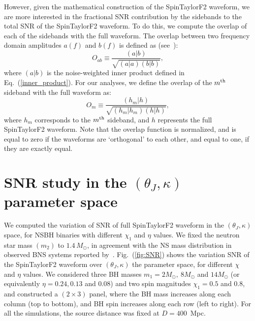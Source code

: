 However, given the mathematical construction of the SpinTaylorF2 waveform, we
are more interested in the fractional SNR contribution by the sidebands to the
total SNR of the SpinTaylorF2 waveform. To do this, we compute the overlap of
each of the sidebands with the full waveform. The overlap between two
frequency domain amplitudes $a(f)$ and $b(f)$ is defined as
(see~\cite{Lundgren2014}):
\begin{equation} 
O_{ab} \equiv \dfrac{(a|b)}{\sqrt{(a|a)(b|b)}},
\end{equation} 
where $(a|b)$ is the noise-weighted inner product defined in
Eq.~(\ref{inner_product}). For our analyses, we define the overlap of the
$m^{\rm th}$ sideband with the full waveform as:
\begin{equation} 
O_{m} \equiv \dfrac{(h_m|h)}{\sqrt{(h_m|h_m)(h|h)}},
\end{equation} 
where $h_m$ corresponds to the $m^{\rm th}$ sideband, and $h$ represents the
full SpinTaylorF2 waveform. Note that the overlap function is normalized, and
is equal to zero if the waveforms are `orthogonal' to each other, and equal to
one, if they are exactly equal.

\section{SNR study in the $(\theta_J, \kappa)$ parameter space}

We computed the variation of SNR of full SpinTaylorF2 waveform in the
$(\theta_J, \kappa)$  space, for NSBH binaries with different $\chi_1$ and
$\eta$ values. We fixed the neutron star mass $(m_{2})$ to $1.4\,M_{\odot}$,
in agreement with the NS mass distribution in observed BNS systems reported
by~\cite{Lorimer}. Fig.~(\ref{fig:SNR}) shows the variation SNR of the
SpinTaylorF2 waveform over $(\theta_J, \kappa)$ the parameter space, for
different $\chi$ and $\eta$ values. We considered three BH masses
$m_1=2M_\odot, ~8M_\odot$ and $14 M_\odot$ (or equivalently $\eta = 0.24,
0.13$ and $0.08$) and two spin magnitudes  $\chi_1 = 0.5$ and $0.8$, and
constructed a $(2\times 3)$ panel, where the BH mass increases along each
column (top to bottom), and BH spin increases along each row (left to right).
For all the simulations, the source distance was fixed at $D=400$~Mpc.

